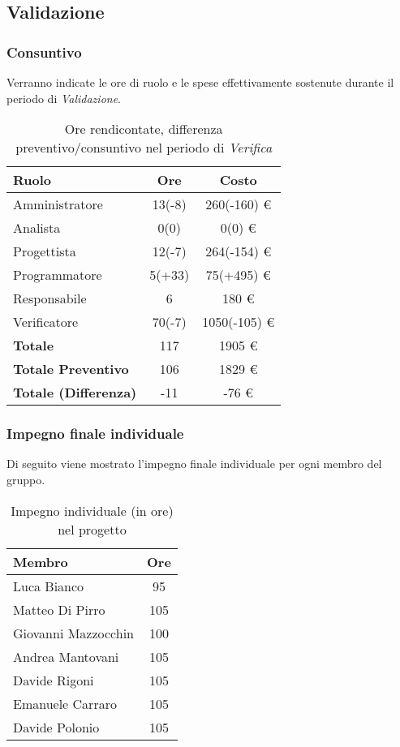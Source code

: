 \subsection{Validazione}
\subsubsection{Consuntivo}
Verranno indicate le ore di ruolo e le spese effettivamente sostenute durante il periodo di \textit{Validazione}.

\begin{table}[H]
	\centering
	\begin{tabular}{ l c c }
		\textbf{Ruolo} & \textbf{Ore} & \textbf{Costo} \\
		\hline
		Amministratore & 13(-8) & 260(-160) \euro{} \\
		Analista & 0(0) & 0(0) \euro{} \\
		Progettista & 12(-7) & 264(-154) \euro{} \\ 
		Programmatore & 5(+33) & 75(+495) \euro{} \\ 
		Responsabile & 6 & 180 \euro{} \\
		Verificatore & 70(-7) & 1050(-105) \euro{} \\
		\hline
		\textbf{Totale \glossaryItem{Consuntivo}} & 117 & 1905 \euro{} \\
		\hline
		\textbf{Totale Preventivo} & 106 & 1829 \euro{} \\
		\hline
		\textbf{Totale (Differenza)} & -11 & -76 \euro{} \\
		\hline
	\end{tabular}
	\caption{Ore rendicontate, differenza preventivo/consuntivo nel periodo di \textit{Verifica}}
\end{table}

\subsubsection{Impegno finale individuale}
Di seguito viene mostrato l'impegno finale individuale per ogni membro del gruppo.
\begin{table}[H]
	\centering
	\begin{tabular}{ l c }
		\textbf{Membro} & \textbf{Ore} \\
		\hline
		Luca Bianco & 95 \\
		Matteo Di Pirro & 105 \\
		Giovanni Mazzocchin & 100 \\ 
		Andrea Mantovani & 105 \\ 
		Davide Rigoni & 105 \\
		Emanuele Carraro & 105 \\
		Davide Polonio & 105 \\
		\hline
	\end{tabular}
	\caption{Impegno individuale (in ore) nel progetto}
\end{table}

